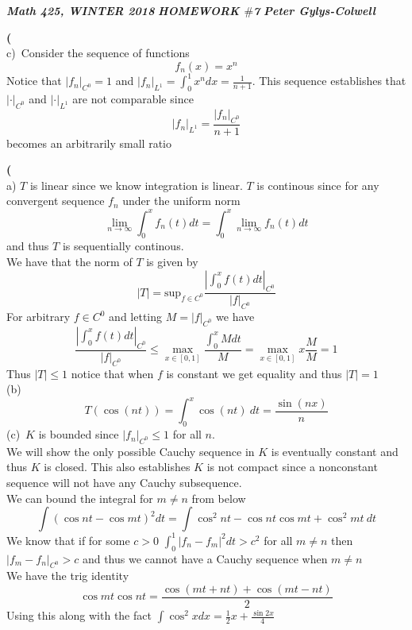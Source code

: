 \documentclass[12pt]{article}
\newenvironment{ques}[1]{\textbf{#1}\vspace{1 mm}\\ }{\bigskip}
\theoremstyle{definition}
\renewcommand{\l}{\left }
\renewcommand{\r}{\right }
\renewcommand{\sup}{\text{sup}}
\newcommand{\s}{\sin}
\renewcommand{\c}{\cos}
\begin{document}
\noindent \textit{\textbf{Math 425, WINTER 2018}} \hspace{1.3cm}
\textit{\textbf{HOMEWORK $\#$7}} \hspace{1.3cm} \textit{\textbf{Peter
Gylys-Colwell}} 

\vspace{1cm}
\begin{ques}{7}
	(c)\ Consider the sequence of functions 
	$$f_n(x) = x^n$$
	Notice that $|f_n|_{C^0} = 1$ and $|f_n|_{L^1} = \int_0^1 x^n dx = \frac 1
	{n+1}$. This sequence establishes that $|\cdot|_{C^0}$ and $|\cdot|_{L^1}$
	are not comparable since 
	$$|f_n|_{L^1} = \frac{|f_n|_{C^0}}{n+1}$$
	becomes an arbitrarily small ratio
\end{ques}

\begin{ques}{8}
	(a) $T$ is linear since we know integration is linear. $T$ is continous
	since for any convergent sequence $f_n$ under the uniform norm 
	$$\lim_{n\to \infty} \int_0^x f_n(t) dt =  \int_0^x\lim_{n\to \infty} f_n(t) dt$$
	and thus $T$ is sequentially continous.\\
	We have that the norm of $T$ is given by 
	$$|T| = \sup_{f \in C^0} \frac{\l| \int_0^x f(t) dt \r|_{C^0}}{|f|_{C^0}}$$
	For arbitrary $f \in C^0$ and letting $M = |f|_{C^0}$ we have
	$$\frac{\l| \int_0^x f(t) dt \r|_{C^0}}{|f|_{C^0}} \leq \max_{x \in
	[0,1]}\frac{\int_0^x M dt}{M} = \max_{x \in [0,1]}x\frac M M = 1$$
	Thus $|T| \leq 1$ notice that when $f$ is constant we get equality and thus
	$|T| = 1$\\
	(b)\ 
	$$T(\cos(nt)) = \int_0^x \cos(nt)\ dt = \frac{\sin(nx)}{n}$$
	(c)\ $K$ is bounded since $|f_n|_{C^0} \leq 1$ for all $n$.\\
	We will show the only possible Cauchy sequence in $K$ is eventually
	constant and thus $K$ is closed. This also establishes $K$ is not compact
	since a nonconstant sequence will not have any Cauchy subsequence. \\
	We can bound the integral for $m \neq n$ from below
	$$\int (\c nt - \c mt)^2 dt = \int \c^2 nt - \c nt \c mt +  \c^2 mt\ dt$$
	We know that if for some $c > 0$ $\int_0^1 |f_n - f_m|^2 dt > c^2$ for all
	$m \neq n$ then $|f_m - f_n|_{C^0} > c$ and thus we cannot have a Cauchy
	sequence when $m \neq n$\\ We have the trig identity
	$$\c mt \c nt = \frac{\c (mt + nt) + \c (mt - nt)}{2}$$
	Using this along with the fact $\int \c^2 x dx = \frac 1 2 x + \frac{\s 2x}{4}$

\end{ques}
\end{document}
